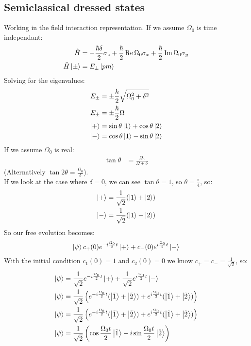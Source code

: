 \subsection{Semiclassical dressed states}
Working in the field interaction representation. If we assume $\Omega_0$ is time independant:
\begin{align*}
	\tilde{H} &= -\frac{\hbar \delta}{2}\sigma_z + \frac{\hbar}{2}\Re \Omega_0 \sigma_x +\frac{\hbar}{2}\Im \Omega_0 \sigma_y \\
	\tilde{H} \ket{\pm} &= E_\pm \ket{pm}
\end{align*}
Solving for the eigenvalues:
\begin{align*}
	E_\pm &= \pm \frac{\hbar}{2}\sqrt{\Omega_0^2 + \delta^2} \\
	E_\pm &= \pm \frac{\hbar}{2}\Omega \\
	\ket{+} &= \sin\theta\ket{1} + \cos\theta \ket{2} \\
	\ket{-} &= \cos\theta\ket{1} - \sin\theta\ket{2}
\end{align*}
If we assume $\Omega_0$ is real:
\begin{align*}
	\tan\theta &= \frac{\Omega_0}{\Omega + \delta}
\end{align*}
(Alternatively $\tan2\theta = \frac{\Omega_0}{\delta}$). \\
If we look at the case where $\delta =0$, we can see $\tan\theta = 1$, so $\theta = \frac{\pi}{4}$, so:
\begin{align*}
	\ket{+} &= \frac{1}{\sqrt{2}} (\ket{1} + \ket{2}) \\
	\ket{-} &= \frac{1}{\sqrt{2}} (\ket{1} - \ket{2})
\end{align*}
So our free evolution becomes:
\begin{align*}
	\ket{\psi} c_+(0) e^{-i\frac{\Omega_0}{2} t}\ket{+} + c_-(0) e^{i\frac{\Omega_0}{2} t} \ket{-}
\end{align*}
With the initial condition $c_1(0) = 1$ and $c_2(0) = 0$ we know $c_+ = c_- = \frac{1}{\sqrt{2}}$, so:
\begin{align*}
	\ket{\psi} &= \frac{1}{\sqrt{2}} e^{-i\frac{\Omega_0}{2} t}\ket{+} + \frac{1}{\sqrt{2}} e^{i\frac{\Omega_0}{2} t} \ket{-} \\
	\ket{\psi} &= \frac{1}{\sqrt{2}} \left(e^{-i\frac{\Omega_0}{2} t}(\ket{\tilde{1}} + \ket{\tilde{2}}) +  e^{i\frac{\Omega_0}{2} t} (\ket{\tilde{1}} + \ket{\tilde{2}})\right) \\
	\ket{\psi} &= \frac{1}{\sqrt{2}} \left(e^{-i\frac{\Omega_0}{2} t}(\ket{\tilde{1}} + \ket{\tilde{2}}) +  e^{i\frac{\Omega_0}{2} t} (\ket{\tilde{1}} + \ket{\tilde{2}})\right) \\
	\ket{\psi} &= \frac{1}{\sqrt{2}}\left(\cos\frac{\Omega_0 t}{2} \ket{\tilde{1}} - i\sin\frac{\Omega_0 t}{2} \ket{\tilde{2}}\right)
\end{align*}
